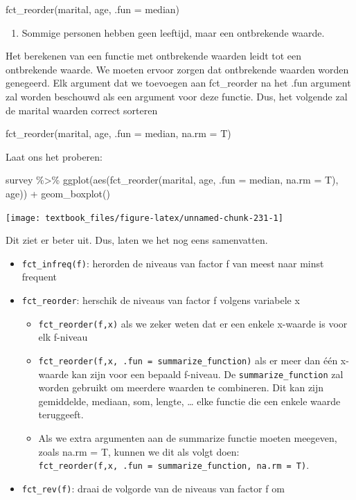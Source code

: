 \documentclass[]{tufte-book}
\newenvironment{Shaded}{}{}
\newcommand{\AttributeTok}[1]{\textcolor[rgb]{0.49,0.56,0.16}{#1}}
\newcommand{\FunctionTok}[1]{\textcolor[rgb]{0.02,0.16,0.49}{#1}}
\newcommand{\NormalTok}[1]{#1}
\newcommand{\SpecialCharTok}[1]{\textcolor[rgb]{0.25,0.44,0.63}{#1}}
\providecommand{\tightlist}{%
  \setlength{\itemsep}{0pt}\setlength{\parskip}{0pt}}
\begin{document}
fct\_reorder(marital, age, .fun = median)

\begin{enumerate}
\def\labelenumi{\arabic{enumi}.}
\setcounter{enumi}{1}
\tightlist
\item
  Sommige personen hebben geen leeftijd, maar een ontbrekende waarde.
\end{enumerate}

Het berekenen van een functie met ontbrekende waarden leidt tot een ontbrekende waarde. We moeten ervoor zorgen dat ontbrekende waarden worden genegeerd. Elk argument dat we toevoegen aan fct\_reorder na het .fun argument zal worden beschouwd als een argument voor deze functie. Dus, het volgende zal de marital waarden correct sorteren

fct\_reorder(marital, age, .fun = median, na.rm = T)

Laat ons het proberen:

\begin{Shaded}
\begin{Highlighting}[]
\NormalTok{survey }\SpecialCharTok{\%\textgreater{}\%}
  \FunctionTok{ggplot}\NormalTok{(}\FunctionTok{aes}\NormalTok{(}\FunctionTok{fct\_reorder}\NormalTok{(marital, age, }\AttributeTok{.fun =}\NormalTok{ median, }\AttributeTok{na.rm =}\NormalTok{ T), age)) }\SpecialCharTok{+}
  \FunctionTok{geom\_boxplot}\NormalTok{()}
\end{Highlighting}
\end{Shaded}

\texttt{[image: textbook\_files/figure-latex/unnamed-chunk-231-1]}

Dit ziet er beter uit. Dus, laten we het nog eens samenvatten.

\begin{itemize}
\tightlist
\item
  \texttt{fct\_infreq(f)}: herorden de niveaus van factor f van meest naar minst frequent
\item
  \texttt{fct\_reorder}: herschik de niveaus van factor f volgens variabele x

  \begin{itemize}
  \tightlist
  \item
    \texttt{fct\_reorder(f,x)} als we zeker weten dat er een enkele x-waarde is voor elk f-niveau
  \item
    \texttt{fct\_reorder(f,x,\ .fun\ =\ summarize\_function)} als er meer dan één x-waarde kan zijn voor een bepaald f-niveau. De \texttt{summarize\_function} zal worden gebruikt om meerdere waarden te combineren. Dit kan zijn gemiddelde, mediaan, som, lengte, \ldots{} elke functie die een enkele waarde teruggeeft.
  \item
    Als we extra argumenten aan de summarize functie moeten meegeven, zoals na.rm = T, kunnen we dit als volgt doen: \texttt{fct\_reorder(f,x,\ .fun\ =\ summarize\_function,\ na.rm\ =\ T)}.
  \end{itemize}
\item
  \texttt{fct\_rev(f)}: draai de volgorde van de niveaus van factor f om
\end{itemize}
\end{document}
